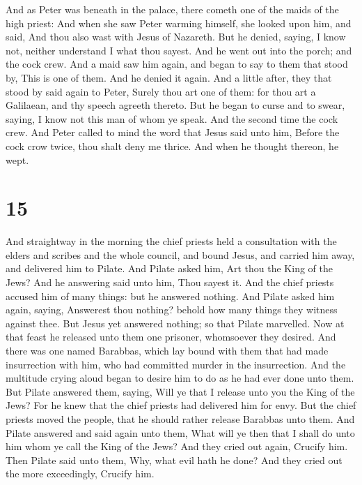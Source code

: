  And as Peter was beneath in the palace, there cometh one
of the maids of the high priest:  And when she saw Peter
warming himself, she looked upon him, and said, And thou also wast with
Jesus of Nazareth.  But he denied, saying, I know not,
neither understand I what thou sayest. And he went out into the porch;
and the cock crew.  And a maid saw him again, and began to
say to them that stood by, This is one of them.  And he
denied it again. And a little after, they that stood by said again to
Peter, Surely thou art one of them: for thou art a Galilaean, and thy
speech agreeth thereto.  But he began to curse and to
swear, saying, I know not this man of whom ye speak.  And
the second time the cock crew. And Peter called to mind the word that
Jesus said unto him, Before the cock crow twice, thou shalt deny me
thrice. And when he thought thereon, he wept.

\hypertarget{section-14}{%
\section{15}\label{section-14}}

 And straightway in the morning the chief priests held a
consultation with the elders and scribes and the whole council, and
bound Jesus, and carried him away, and delivered him to Pilate.
 And Pilate asked him, Art thou the King of the Jews? And he
answering said unto him, Thou sayest it.  And the chief
priests accused him of many things: but he answered nothing.
 And Pilate asked him again, saying, Answerest thou nothing?
behold how many things they witness against thee.  But Jesus
yet answered nothing; so that Pilate marvelled.  Now at that
feast he released unto them one prisoner, whomsoever they desired.
 And there was one named Barabbas, which lay bound with them
that had made insurrection with him, who had committed murder in the
insurrection.  And the multitude crying aloud began to
desire him to do as he had ever done unto them.  But Pilate
answered them, saying, Will ye that I release unto you the King of the
Jews?  For he knew that the chief priests had delivered him
for envy.  But the chief priests moved the people, that he
should rather release Barabbas unto them.  And Pilate
answered and said again unto them, What will ye then that I shall do
unto him whom ye call the King of the Jews?  And they cried
out again, Crucify him.  Then Pilate said unto them, Why,
what evil hath he done? And they cried out the more exceedingly, Crucify
him.

